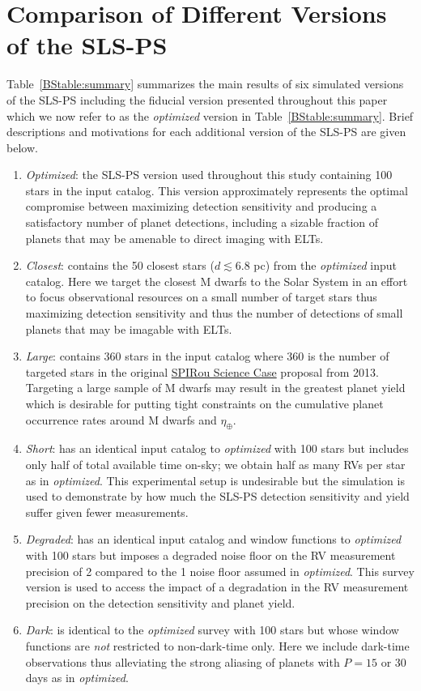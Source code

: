 \section{Comparison of Different Versions of the SLS-PS} \label{BSsect:surveys}
Table~\ref{BStable:summary} summarizes the main results of six simulated versions of the SLS-PS
including the fiducial version presented throughout this paper which we now refer to as the
\emph{optimized} version in Table~\ref{BStable:summary}. Brief descriptions and motivations
for each additional version of the SLS-PS are given below.

\begin{enumerate}
\item \emph{Optimized}: the SLS-PS version used throughout this study containing 100 stars
  in the input catalog. This version approximately represents the optimal compromise between maximizing
  detection sensitivity and producing a satisfactory number of planet detections, including
  a sizable fraction of planets that may be amenable to direct imaging with ELTs. 
\item \emph{Closest}: contains the 50 closest stars ($d \lesssim 6.8$ pc) from the \emph{optimized}
  input catalog. Here we target the closest M dwarfs to the Solar System in an effort to focus
  observational resources on a small number of target stars thus maximizing detection sensitivity and thus
  the number of detections of small planets that may be imagable with ELTs.
\item \emph{Large}: contains 360 stars in the input catalog where 360 is the number of targeted
  stars in the original
  \href{http://spirou.irap.omp.eu/content/download/232/1348/file/SPIRou-sciencecase-last.pdf}{SPIRou Science Case}
  proposal from 2013. Targeting a large sample of M dwarfs may result in the greatest planet yield
  which is desirable for putting tight constraints on the cumulative planet occurrence rates around M dwarfs
  and $\eta_{\oplus}$. 
\item \emph{Short}: has an identical input catalog to \emph{optimized} with 100 stars but includes
  only half of total available time on-sky; we obtain half as many RVs per star as in \emph{optimized}. This
  experimental setup is undesirable but the simulation is used to demonstrate by how much the SLS-PS detection
  sensitivity and yield suffer given fewer measurements.
\item \emph{Degraded}: has an identical input catalog and window functions to \emph{optimized} with 100
  stars but imposes a degraded noise floor on the RV measurement precision of 2 \mps{} compared to the 1 \mps{}
  noise floor assumed in \emph{optimized}. This survey version is used to access the impact of
  a degradation in the RV measurement precision on the detection sensitivity and planet yield.
\item \emph{Dark}: is identical to the \emph{optimized} survey with 100 stars but whose window functions are
  \emph{not} restricted to non-dark-time only. Here we include dark-time observations thus alleviating the
  strong aliasing of planets with $P=15$ or 30 days as in \emph{optimized}. 
\end{enumerate}


